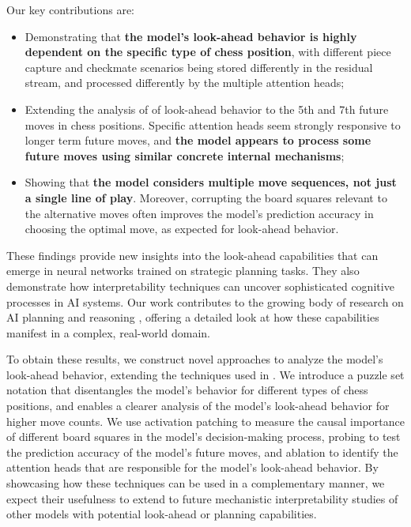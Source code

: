 \documentclass{article}
\begin{document}
Our key contributions are:
\begin{itemize}
    \item Demonstrating that \textbf{the model's look-ahead behavior is highly dependent on the specific type of chess position}, with different piece capture and checkmate scenarios being stored differently in the residual stream, and processed differently by the multiple attention heads;
    \item Extending the analysis of \citet{jenner2024evidence} of look-ahead behavior to the 5th and 7th future moves in chess positions. Specific attention heads seem strongly responsive to longer term future moves, and \textbf{the model appears to process some future moves using similar concrete internal mechanisms};
    \item Showing that \textbf{the model considers multiple move sequences, not just a single line of play}. Moreover, corrupting the board squares relevant to the alternative moves often improves the model's prediction accuracy in choosing the optimal move, as expected for look-ahead behavior.
\end{itemize}

These findings provide new insights into the look-ahead capabilities that can emerge in neural networks trained on strategic planning tasks. They also demonstrate how interpretability techniques can uncover sophisticated cognitive processes in AI systems. Our work contributes to the growing body of research on AI planning and reasoning \citep{chen2021decision,hao2023reasoning,ivanitskiyStructuredWorldRepresentations2023,garriga-alonsoPlanningBehaviorRecurrent2024}, offering a detailed look at how these capabilities manifest in a complex, real-world domain.

To obtain these results, we construct novel approaches to analyze the model's look-ahead behavior, extending the techniques used in \citet{jenner2024evidence}. We introduce a puzzle set notation that disentangles the model's behavior for different types of chess positions, and enables a clearer analysis of the model's look-ahead behavior for higher move counts. We use activation patching to measure the causal importance of different board squares in the model's decision-making process, probing to test the prediction accuracy of the model's future moves, and ablation to identify the attention heads that are responsible for the model's look-ahead behavior. By showcasing how these techniques can be used in a complementary manner, we expect their usefulness to extend to future mechanistic interpretability studies of other models with potential look-ahead or planning capabilities.
\end{document}
